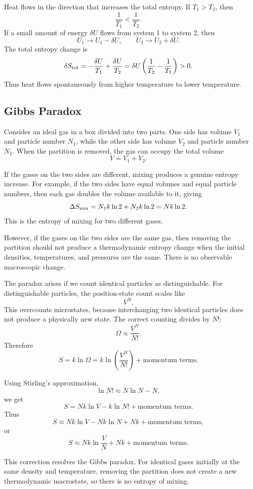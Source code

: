 \documentclass{report}
\numberwithin{equation}{section}
\begin{document}
Heat flows in the direction that increases the total entropy. If \(T_1>T_2\), then
\[
\frac{1}{T_1}<\frac{1}{T_2}.
\]
If a small amount of energy \(\delta U\) flows from system 1 to system 2, then
\[
U_1\to U_1-\delta U,
\qquad
U_2\to U_2+\delta U.
\]
The total entropy change is
\[
\delta S_{\rm tot}
=
-\frac{\delta U}{T_1}
+
\frac{\delta U}{T_2}
=
\delta U\left(\frac{1}{T_2}-\frac{1}{T_1}\right)>0.
\]
Thus heat flows spontaneously from higher temperature to lower temperature.

\subsection{Gibbs Paradox}

Consider an ideal gas in a box divided into two parts. One side has volume \(V_1\) and particle number \(N_1\), while the other side has volume \(V_2\) and particle number \(N_2\). When the partition is removed, the gas can occupy the total volume
\[
V=V_1+V_2.
\]

If the gases on the two sides are different, mixing produces a genuine entropy increase. For example, if the two sides have equal volumes and equal particle numbers, then each gas doubles the volume available to it, giving
\[
\Delta S_{\rm mix}
=
N_1k\ln 2+N_2k\ln 2
=
Nk\ln 2.
\]
This is the entropy of mixing for two different gases.

However, if the gases on the two sides are the same gas, then removing the partition should not produce a thermodynamic entropy change when the initial densities, temperatures, and pressures are the same. There is no observable macroscopic change.

The paradox arises if we count identical particles as distinguishable. For distinguishable particles, the position-state count scales like
\[
V^N.
\]
This overcounts microstates, because interchanging two identical particles does not produce a physically new state. The correct counting divides by \(N!\):
\[
\Omega\propto \frac{V^N}{N!}.
\]
Therefore
\[
S=k\ln\Omega
=
k\ln\left(\frac{V^N}{N!}\right)+\text{momentum terms}.
\]

Using Stirling's approximation,
\[
\ln N!\approx N\ln N-N,
\]
we get
\[
S
=
Nk\ln V-k\ln N!+\text{momentum terms}.
\]
Thus
\[
S
\approx
Nk\ln V-Nk\ln N+Nk+\text{momentum terms},
\]
or
\[
S
\approx
Nk\ln\frac{V}{N}+Nk+\text{momentum terms}.
\]

This correction resolves the Gibbs paradox. For identical gases initially at the same density and temperature, removing the partition does not create a new thermodynamic macrostate, so there is no entropy of mixing.
\end{document}
